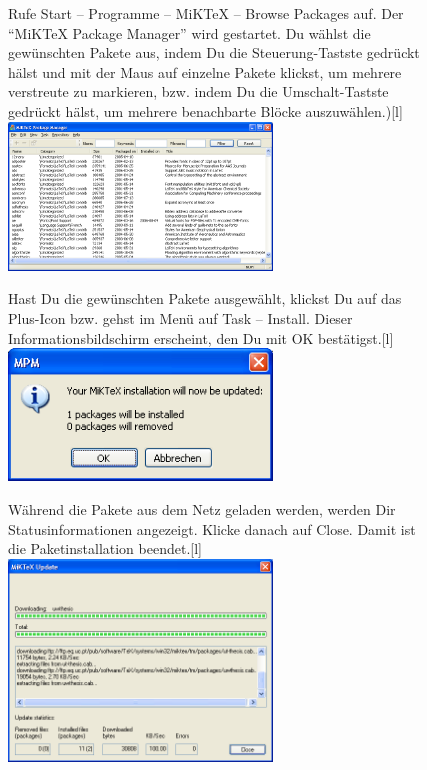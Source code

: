 \begin{figure}[hb]
	\begin{captionbeside}{Rufe Start -- Programme -- MiKTeX -- Browse Packages auf. Der \enquote{MiKTeX Package Manager} wird gestartet. Du wählst die gewünschten Pakete aus, indem Du die Steuerung-Tastste gedrückt hälst und mit der Maus auf einzelne Pakete klickst, um mehrere verstreute zu markieren, bzw. indem Du die Umschalt-Tastste gedrückt hälst, um mehrere benachbarte Blöcke auszuwählen.)}[l]
		\includegraphics[width=7cm]{images/MiKTeX-packet-install-01.png}
	\end{captionbeside}
	\label{fig:install10}
\end{figure}

\begin{figure}[hb]
	\begin{captionbeside}{Hast Du die gewünschten Pakete ausgewählt, klickst Du auf das Plus-Icon bzw. gehst im Menü auf Task -- Install. Dieser Informationsbildschirm erscheint, den Du mit OK bestätigst.}[l]
		\includegraphics[width=7cm]{images/MiKTeX-packet-install-02.png}
	\end{captionbeside}
	\label{fig:install03b}
\end{figure}

\begin{figure}
	\begin{captionbeside}[Download]{Während die Pakete aus dem Netz geladen werden, werden Dir Statusinformationen angezeigt. Klicke danach auf Close. Damit ist die Paketinstallation beendet.}[l]
		\includegraphics[width=7cm]{images/MiKTeX-packet-install-03.png}
	\end{captionbeside}
	\label{fig:install05b}
\end{figure}

